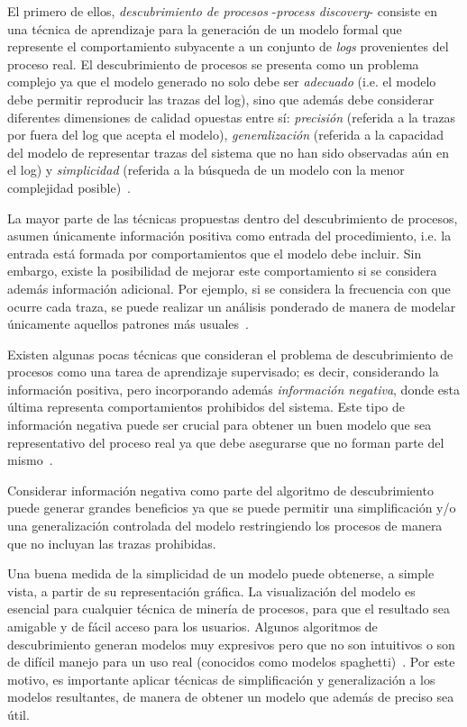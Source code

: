 El primero de ellos, \textit{descubrimiento de procesos} -\textit{process discovery}- consiste
en una técnica de aprendizaje para la generación de un modelo formal que represente el comportamiento
subyacente a un conjunto de \textit{logs} provenientes del proceso real.
El descubrimiento de procesos se presenta como un problema complejo ya que el modelo generado
no solo debe ser \emph{adecuado} (i.e. el modelo debe permitir reproducir las trazas del log),
sino que además debe considerar diferentes dimensiones de calidad opuestas entre sí:
\emph{precisión} (referida a la trazas por fuera del log que acepta el modelo),
\emph{generalización} (referida a la capacidad del modelo de representar trazas del sistema que no han sido observadas aún en el log) y
\emph{simplicidad} (referida a la búsqueda de un modelo con la menor complejidad posible)~\cite{BuijsvDBAalst,Aalst2012}.

La mayor parte de las técnicas propuestas dentro del descubrimiento de procesos, asumen únicamente información
positiva como entrada del procedimiento, i.e. la entrada está formada por comportamientos que el modelo debe 
incluir. Sin embargo, existe la posibilidad de mejorar este comportamiento si se considera además información 
adicional. Por ejemplo, si se considera la frecuencia con que ocurre cada traza, se puede realizar un análisis
ponderado de manera de modelar únicamente aquellos patrones más usuales~\cite{GuntherA07,WeijtersR11,LeemansFA13}.

Existen algunas pocas técnicas que consideran el problema de descubrimiento de procesos como una tarea de
aprendizaje supervisado; es decir, considerando la información positiva, pero incorporando además \emph{información negativa},
donde esta última representa comportamientos prohibidos del sistema. Este tipo de información negativa puede ser crucial para 
obtener un buen modelo que sea representativo del proceso real ya que debe asegurarse que no forman
parte del mismo~\cite{Ferreira2006,Lamma2007,Lamma2008,alberti2008verifiable,Goedertier2009}.

Considerar información negativa como parte del algoritmo de descubrimiento puede generar grandes beneficios ya que
se puede permitir una simplificación y/o una generalización controlada del modelo restringiendo los procesos de 
manera que no incluyan las trazas prohibidas.


Una buena medida de la simplicidad de un modelo puede obtenerse, a simple vista, a partir de su representación gráfica.
La visualización del modelo es esencial para cualquier técnica de minería de procesos, para que el resultado sea amigable
y de fácil acceso para los usuarios. Algunos algoritmos de descubrimiento generan modelos muy expresivos
pero que no son intuitivos o son de difícil manejo para un uso real (conocidos como modelos spaghetti)~\cite{AalstSP11}. 
Por este motivo, es importante aplicar técnicas de simplificación y generalización a los modelos resultantes,
de manera de obtener un modelo que además de preciso sea útil.

